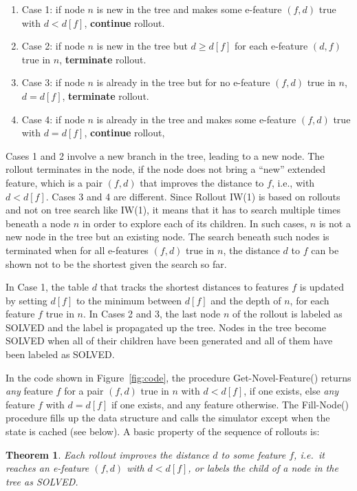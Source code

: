 \documentclass[letterpaper]{article}
\newtheorem{theorem}[definition]{Theorem}
\begin{document}
\begin{enumerate}[$\bullet$]
  \item Case 1: if node $n$ is new in the tree and makes some e-feature $(f,d)$ true with $d < d[f]$, \textbf{continue} rollout.
  \item Case 2: if node $n$ is new in the tree but $d \geq d[f]$ for each e-feature $(d,f)$ true in $n$, \textbf{terminate} rollout.
  \item Case 3: if node $n$ is already in the tree but for no e-feature $(f,d)$ true in $n$, $d = d[f]$, \textbf{terminate} rollout.
  \item Case 4: if node $n$ is already in the tree and makes some e-feature $(f,d)$ true with $d = d[f]$, \textbf{continue} rollout,
\end{enumerate}

Cases 1 and 2 involve a  new branch in the tree, leading to a new node. The rollout terminates in the node, if the node  does not bring
a ``new'' extended feature, which is a pair $(f,d)$ that improves the distance to $f$, i.e., with  $d < d[f]$.
Cases 3 and 4 are different. Since Rollout IW(1) is based on rollouts and not on  tree search like IW(1), it means
that it has to search multiple times beneath a node $n$ in order to explore each of its children.
In such cases, $n$ is not a new node in the tree but an existing  node.
The  search beneath such  nodes is  terminated when for all e-features $(f,d)$ true in $n$,
the distance $d$ to $f$ can be shown not to be the shortest  given the search so far.

In Case 1, the table $d$ that tracks the shortest distances to features $f$ is updated
by setting $d[f]$ to  the minimum between  $d[f]$ and the depth of  $n$, for each feature $f$ true in $n$.
In Cases 2 and 3, the last  node $n$ of the rollout is labeled as SOLVED and the label is propagated
up the tree. Nodes  in the tree become  SOLVED when all of their children have been
generated and all of them have been labeled as SOLVED.

In the code shown in  Figure~\ref{fig:code}, the procedure
Get-Novel-Feature() returns \emph{any}  feature $f$ for a pair $(f,d)$ true in $n$
with $d < d[f]$,  if one exists, else  \emph{any}  feature $f$ with  $d=d[f]$ if one exists,
and any feature otherwise.  The Fill-Node() procedure fills up the data structure and
calls  the simulator except when the state is cached (see below).
A basic property of the sequence of rollouts is:

\begin{theorem}
\label{thm:1}
Each rollout improves the distance $d$ to some feature $f$, i.e.\ it reaches an e-feature $(f,d)$
with $d < d[f]$, or labels the child of a node in the tree as SOLVED.
\end{theorem}
\end{document}
